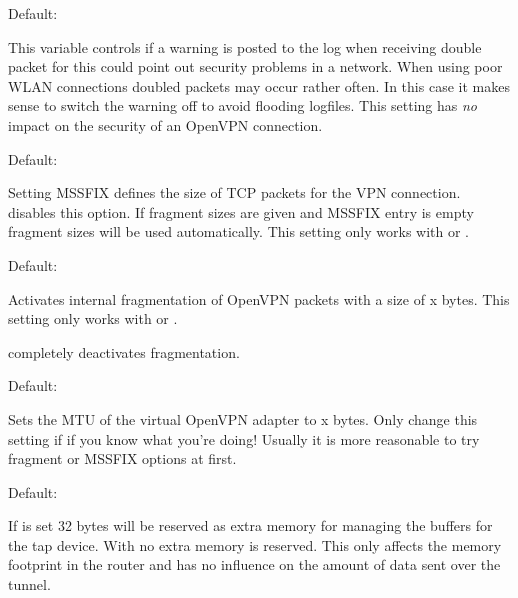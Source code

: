 \begin{description}

  Default: 

  This variable controls if a warning is posted to the log when receiving 
  double packet for this could point out security problems in a network. 
  When using poor WLAN connections doubled packets may occur rather often. 
  In this case it makes sense to switch the warning off to avoid flooding 
  logfiles. This setting has \emph{no} impact on the security of an 
  OpenVPN connection.


  Default: 

  Setting MSSFIX defines the size of TCP packets for the VPN connection. 
   disables this option. If fragment sizes 
  are given and MSSFIX entry is empty fragment sizes will be used automatically.
  This setting only works with  or .


  Default: 

  Activates internal fragmentation of OpenVPN packets with a size of x bytes. 
  This setting only works with  or .

   completely deactivates fragmentation.


  Default: 

  Sets the MTU of the virtual OpenVPN adapter to x bytes. Only change this setting if 
  if you know what you're doing! Usually it is more reasonable to try fragment or MSSFIX 
  options at first.


  Default: 

  If  is set 32 bytes will be reserved 
  as extra memory for managing the buffers for the tap device. With 
   no extra memory is reserved. 
  This only affects the memory footprint in the router and has no 
  influence on the amount of data sent over the tunnel.


\end{description}
